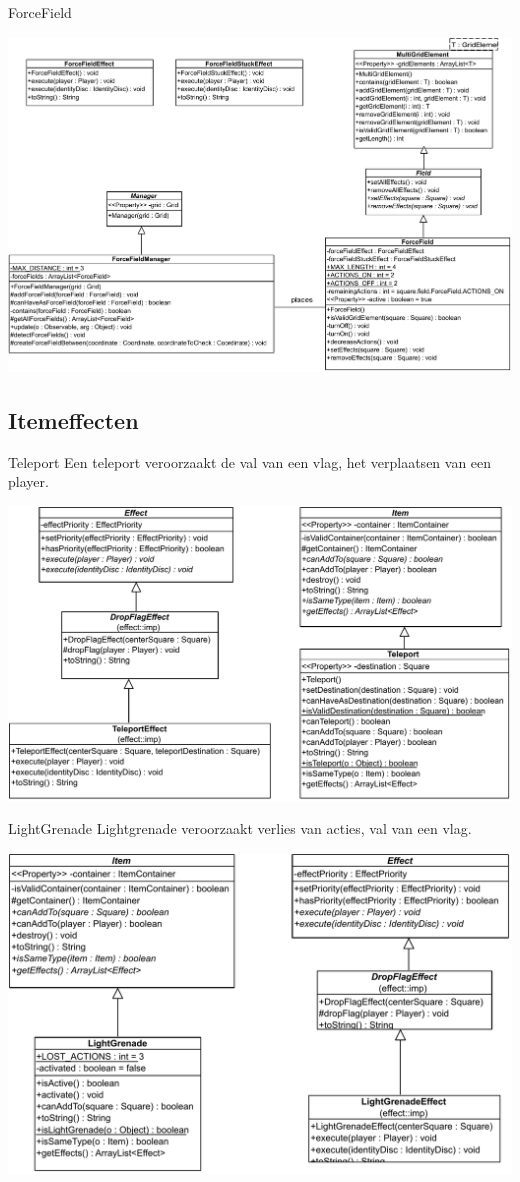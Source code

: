 \documentclass[11pt,t]{beamer}
\begin{document}
\begin{frame}{ForceField}
\begin{center}
\includegraphics[width=0.8\linewidth]{images/forcefield}
\end{center}

\subsection{Itemeffecten}
\end{frame}
\begin{frame}{Teleport}
Een teleport veroorzaakt de val van een vlag, het verplaatsen van een player.
\begin{center}
\includegraphics[width= 0.85\linewidth]{images/teleporteffect}
\end{center}
\end{frame}

\begin{frame}{LightGrenade}
Lightgrenade veroorzaakt verlies van acties, val van een vlag.
\begin{center}
\includegraphics[width= 0.85\linewidth]{images/lightgrenadeeffect}
\end{center}
\end{frame}
\end{document}
